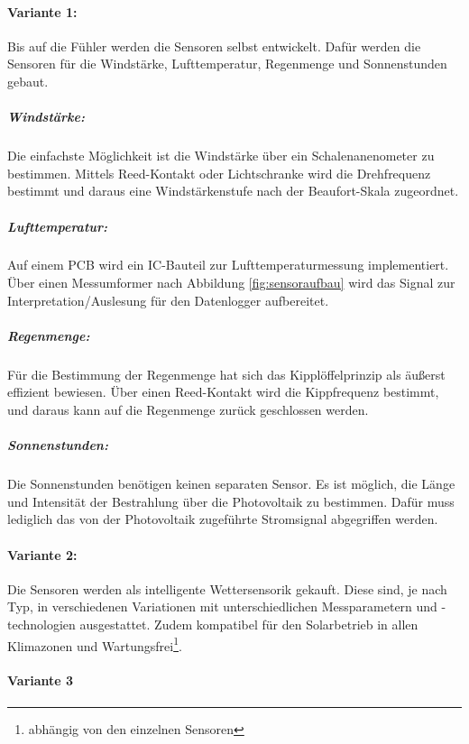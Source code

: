 \paragraph{Variante 1:}

Bis auf die Fühler werden die Sensoren selbst entwickelt. Dafür werden die Sensoren für die Windstärke, Lufttemperatur, Regenmenge und  Sonnenstunden gebaut.\\

\subparagraph{Windstärke:}
Die einfachste Möglichkeit ist die Windstärke über ein Schalenanenometer zu bestimmen. Mittels Reed-Kontakt oder Lichtschranke wird die Drehfrequenz bestimmt und daraus eine Windstärkenstufe nach der Beaufort-Skala zugeordnet.\\

\subparagraph{Lufttemperatur:}
Auf einem PCB wird ein IC-Bauteil zur Lufttemperaturmessung implementiert. Über einen Messumformer nach Abbildung \ref{fig:sensoraufbau} wird das Signal zur Interpretation/Auslesung für den Datenlogger aufbereitet.\\

\subparagraph{Regenmenge:}
Für die Bestimmung der Regenmenge hat sich das Kipplöffelprinzip als äußerst effizient bewiesen. Über einen Reed-Kontakt wird die Kippfrequenz bestimmt, und daraus kann auf die Regenmenge zurück geschlossen werden.\\

\subparagraph{Sonnenstunden:}
Die Sonnenstunden benötigen keinen separaten Sensor. Es ist möglich, die Länge und Intensität der Bestrahlung über die Photovoltaik zu bestimmen. Dafür muss lediglich das von der Photovoltaik zugeführte Stromsignal abgegriffen werden.\\

\paragraph{Variante 2:}

Die Sensoren werden als intelligente Wettersensorik gekauft. Diese sind, je nach Typ, in verschiedenen Variationen mit unterschiedlichen Messparametern und -technologien ausgestattet. Zudem kompatibel für den Solarbetrieb in allen Klimazonen und Wartungsfrei\footnote{abhängig von den einzelnen Sensoren}.\\

\newpage
\paragraph{Variante 3}

